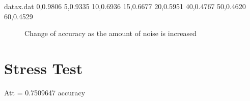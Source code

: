 \begin{filecontents}{datax.dat}
0,0.9806
5,0.9335
10,0.6936
15,0.6677
20,0.5951
40,0.4767
50,0.4620
60,0.4529
\end{filecontents}

\begin{figure}[ht]
    \centering
    \captionsetup{justification=centering}
    \caption{Change of accuracy as the amount of noise is increased}
    \label{fig:noise_accuracy}
\end{figure}

\section{Stress Test}
Att = 0.7509647 accuracy